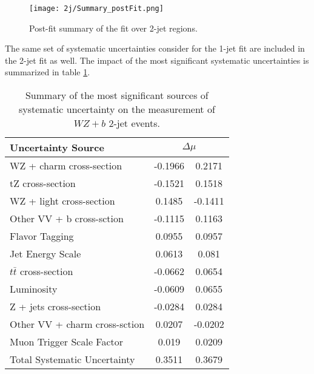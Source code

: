 \begin{figure}[H]
    \center
    \texttt{[image: 2j/Summary\_postFit.png]}
    \caption{Post-fit summary of the fit over 2-jet regions.}
    \label{fig:fit_results_2j}
\end{figure}


The same set of systematic uncertainties consider for the 1-jet fit are included in the 2-jet fit as well. The impact of the most significant systematic uncertainties is summarized in table \ref{tab:systematics_2j}. 

\begin{table}[H]
    \centering
    \begin{tabular}{l|cc}
        \hline\hline
        Uncertainty Source & \multicolumn{2}{c}{$\Delta \mu$ }  \\
        \hline
        WZ + charm cross-section & -0.1966 & 0.2171 \\
        tZ cross-section & -0.1521 & 0.1518 \\
        WZ + light cross-section & 0.1485 & -0.1411 \\
        Other VV + b cross-sction & -0.1115 & 0.1163 \\
        Flavor Tagging & 0.0955 & 0.0957 \\
        Jet Energy Scale & 0.0613 & 0.081 \\
        $t\bar{t}$ cross-section & -0.0662 & 0.0654 \\
        Luminosity & -0.0609 & 0.0655 \\
        Z + jets cross-section & -0.0284 & 0.0284 \\
        Other VV + charm cross-sction & 0.0207 & -0.0202 \\
        Muon Trigger Scale Factor & 0.019 & 0.0209 \\
        \hline
        Total Systematic Uncertainty & 0.3511 & 0.3679 \\
        \hline\hline
    \end{tabular}
    \caption{Summary of the most significant sources of systematic uncertainty on the measurement of $WZ+b$ 2-jet events.}
    \label{tab:systematics_2j}
\end{table}

